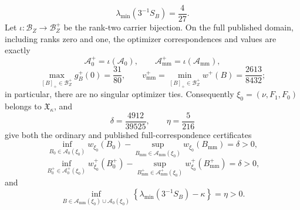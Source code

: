 \[
\lambda_{\min}(3^{-1}S_B)=\frac4{27}.
\]
Let \(\iota:\mathcal B_Z\to\mathcal B_Z^+\) be the rank-two carrier bijection.  On the full published domain, including ranks zero and one, the optimizer correspondences and values are exactly
\[
\mathcal A_0^+=\iota(\mathcal A_0),
\qquad
\mathcal A_{\mathrm{mm}}^+=\iota(\mathcal A_{\mathrm{mm}}),
\]
\[
\max_{[B]_+\in\mathcal B_Z^+}g_B^+(0)=\frac{31}{80},
\qquad
v_{\mathrm{mm}}^+=\min_{[B]_+\in\mathcal B_Z^+}w^+(B)
=\frac{2613}{8432};
\]
in particular, there are no singular optimizer ties.  Consequently \(\xi_0=(\nu,F_1,F_0)\) belongs to \(\mathfrak X_\kappa\), and
\[
\delta=\frac{4912}{39525},
\qquad
\eta=\frac5{216}
\]
give both the ordinary and published full-correspondence certificates
\[
\inf_{B_0\in\mathcal A_0(\xi_0)}w_{\xi_0}(B_0)
-\sup_{B_{\mathrm{mm}}\in\mathcal A_{\mathrm{mm}}(\xi_0)}w_{\xi_0}(B_{\mathrm{mm}})
=\delta>0,
\]
\[
\inf_{B_0^+\in\mathcal A_0^+(\xi_0)}w_{\xi_0}^+(B_0^+)
-\sup_{B_{\mathrm{mm}}^+\in\mathcal A_{\mathrm{mm}}^+(\xi_0)}w_{\xi_0}^+(B_{\mathrm{mm}}^+)
=\delta>0,
\]
and
\[
\inf_{B\in\mathcal A_{\mathrm{mm}}(\xi_0)\cup\mathcal A_0(\xi_0)}
\left\{\lambda_{\min}(3^{-1}S_B)-\kappa\right\}
=\eta>0.
\]